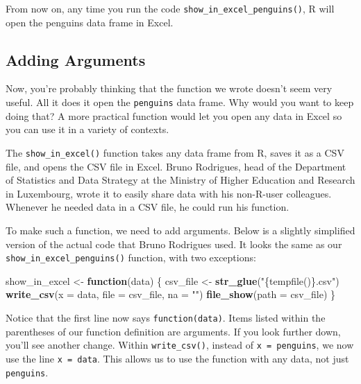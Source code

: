 \documentclass[
]{book}
\newenvironment{Shaded}{\begin{snugshade}}{\end{snugshade}}
\newcommand{\AttributeTok}[1]{\textcolor[rgb]{0.13,0.29,0.53}{#1}}
\newcommand{\ControlFlowTok}[1]{\textcolor[rgb]{0.13,0.29,0.53}{\textbf{#1}}}
\newcommand{\FunctionTok}[1]{\textcolor[rgb]{0.13,0.29,0.53}{\textbf{#1}}}
\newcommand{\NormalTok}[1]{#1}
\newcommand{\OtherTok}[1]{\textcolor[rgb]{0.56,0.35,0.01}{#1}}
\newcommand{\StringTok}[1]{\textcolor[rgb]{0.31,0.60,0.02}{#1}}
\begin{document}
From now on, any time you run the code \texttt{show\_in\_excel\_penguins()}, R will open the penguins data frame in Excel.

\hypertarget{adding-arguments}{%
\subsection*{Adding Arguments}\label{adding-arguments}}

Now, you're probably thinking that the function we wrote doesn't seem very useful. All it does it open the \texttt{penguins} data frame. Why would you want to keep doing that? A more practical function would let you open any data in Excel so you can use it in a variety of contexts.

The \texttt{show\_in\_excel()} function takes any data frame from R, saves it as a CSV file, and opens the CSV file in Excel. Bruno Rodrigues, head of the Department of Statistics and Data Strategy at the Ministry of Higher Education and Research in Luxembourg, wrote it to easily share data with his non-R-user colleagues. Whenever he needed data in a CSV file, he could run his function.

To make such a function, we need to add arguments. Below is a slightly simplified version of the actual code that Bruno Rodrigues used. It looks the same as our \texttt{show\_in\_excel\_penguins()} function, with two exceptions:

\begin{Shaded}
\begin{Highlighting}[]
\NormalTok{show\_in\_excel }\OtherTok{\textless{}{-}} \ControlFlowTok{function}\NormalTok{(data) \{}
\NormalTok{  csv\_file }\OtherTok{\textless{}{-}} \FunctionTok{str\_glue}\NormalTok{(}\StringTok{"\{tempfile()\}.csv"}\NormalTok{)}
  \FunctionTok{write\_csv}\NormalTok{(}\AttributeTok{x =}\NormalTok{ data,}
            \AttributeTok{file =}\NormalTok{ csv\_file,}
            \AttributeTok{na =} \StringTok{""}\NormalTok{)}
  \FunctionTok{file\_show}\NormalTok{(}\AttributeTok{path =}\NormalTok{ csv\_file)}
\NormalTok{\}}
\end{Highlighting}
\end{Shaded}

Notice that the first line now says \texttt{function(data)}. Items listed within the parentheses of our function definition are arguments. If you look further down, you'll see another change. Within \texttt{write\_csv()}, instead of \texttt{x\ =\ penguins}, we now use the line \texttt{x\ =\ data}. This allows us to use the function with any data, not just \texttt{penguins}.
\end{document}
